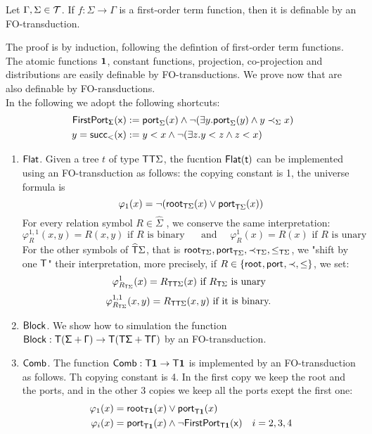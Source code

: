 \begin{proposition}
Let $\Gamma, \Sigma \in {\mathcal T}$. If $f:\Sigma\to\Gamma$ is a first-order term function, then it is definable by an FO-transduction. 
\end{proposition}

\begin{pr}
The proof is by induction, following the defintion of first-order term functions. The atomic functions $\mathbf{1}$, constant functions, projection, co-projection and distributions are easily definable by FO-transductions.  
We prove now that are also definable by FO-ransductions. 
\\

In the following we adopt the following shortcuts:
\begin{align*}
\sf{FirstPort}_\Sigma (x)& := \mathsf{port}_{\Sigma}(x)\wedge \neg (\exists y. \mathsf{port}_{\Sigma}(y)\wedge y\prec_\Sigma x)\\
y=\sf{succ}_< (x) &:=  y<x \wedge \neg (\exists z. y<z \wedge z<x)
\end{align*} 
\begin{enumerate}
\item $\sf{Flat}$. Given a tree $t$ of type $\mathsf T\mathsf T\Sigma$, the fucntion $\sf{Flat}(t)$ can be implemented using an FO-transduction as follows: the copying constant is 1, the universe formula is 
\[\varphi_1(x) = \neg (\mathsf{root}_{\mathsf T\Sigma}(x) \vee \mathsf{port}_{\mathsf T\Sigma}(x) )  \]
For every relation symbol $R\in\widehat \Sigma$ , we conserve the same interpretation:
\[\varphi_R^{1,1}(x,y)=R(x,y) \text{ if $R$ is binary }
\quad \text{ and } \quad\varphi_R^{1}(x)=R(x) \text{ if $R$ is unary }\] 
For the other symbols of $\widehat{\mathsf T}\Sigma$, that is $\mathsf{root}_{\mathsf T\Sigma},\mathsf{port}_{\mathsf T\Sigma}, \prec_{\mathsf T\Sigma}, \leq_{\mathsf T\Sigma}$, we "shift by one $\mathsf T$" their interpretation, more precisely, if $R\in\{\mathsf{root}_{}, \mathsf{port}_{}, \prec, \leq\}$, we set:
\[ \varphi^1_{R_{\mathsf T\Sigma}}(x) = R_{\mathsf T\mathsf T\Sigma}(x) \text{ if $R_{\mathsf T\Sigma}$ is unary } \]
\[\varphi^{1,1}_{R_{\mathsf T\Sigma}}(x,y) = R_{\mathsf T\mathsf T\Sigma}(x,y) \text{ if it is binary. }\] 
\item $\sf{Block}$. We show how to simulation the function $\sf{Block}:\mathsf T (\Sigma + \Gamma) \to \mathsf T (\mathsf T \Sigma + \mathsf T \Gamma)$ by an FO-transduction. 
\item $\sf{Comb}$. The function $\sf{Comb}:\mathsf T \mathbf{1}\to\mathsf T\mathbf{1}$ is implemented by an FO-transduction as follows. Th copying constant is 4. 
In the first copy we keep the root and the ports, and in the other 3 copies we keep all the ports exept the first one:
\begin{align*}
\varphi_1(x)&=\mathsf{root}_{\mathsf T\mathbf{1}}(x) \vee \mathsf{port}_{\mathsf T\mathbf{1}}(x)\\
\varphi_i(x)&=\mathsf{port}_{\mathsf T\mathbf{1}}(x)\wedge \neg \sf{FirstPort}_{\mathsf T\mathbf{1}}(x)& i=2,3,4
\end{align*}


\end{enumerate}
\end{pr}
